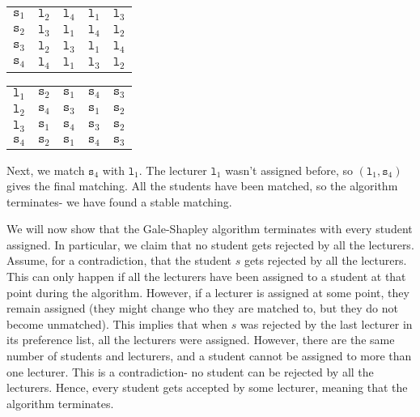 \documentclass[a4paper, openany]{memoir}
\begin{document}
    \begin{table}[H]
        \centering
        \begin{subtable}{0.45\textwidth}
            \centering
            \begin{tabular}{c|cccc}
                $\texttt{s}_1$ & {\color{blue!60} $\texttt{l}_2$} & \underline{$\texttt{l}_4$} & $\texttt{l}_1$ & $\texttt{l}_3$ \\
                $\texttt{s}_2$ & \underline{$\texttt{l}_3$} & $\texttt{l}_1$ & $\texttt{l}_4$ & $\texttt{l}_2$ \\
                $\texttt{s}_3$ & \underline{$\texttt{l}_2$} & $\texttt{l}_3$ & $\texttt{l}_1$ & $\texttt{l}_4$ \\
                $\texttt{s}_4$ & {\color{blue!60}$\texttt{l}_4$} & \underline{$\texttt{l}_1$} & $\texttt{l}_3$ & $\texttt{l}_2$
            \end{tabular}
        \end{subtable}
        \hfill
        \begin{subtable}{0.45\textwidth}
            \centering
            \begin{tabular}{c|cccc}
                $\texttt{l}_1$ & $\texttt{s}_2$ & $\texttt{s}_1$ & \underline{$\texttt{s}_4$} & $\texttt{s}_3$ \\
                $\texttt{l}_2$ & $\texttt{s}_4$ & \underline{$\texttt{s}_3$} & $\texttt{s}_1$ & $\texttt{s}_2$ \\
                $\texttt{l}_3$ & $\texttt{s}_1$ & $\texttt{s}_4$ & $\texttt{s}_3$ & \underline{$\texttt{s}_2$} \\
                $\texttt{s}_4$ & $\texttt{s}_2$ & \underline{$\texttt{s}_1$} & $\texttt{s}_4$ & $\texttt{s}_3$
            \end{tabular}
        \end{subtable}
    \end{table}
    \noindent Next, we match $\texttt{s}_4$ with $\texttt{l}_1$. The lecturer $\texttt{l}_1$ wasn't assigned before, so $(\texttt{l}_1, \texttt{s}_4)$ gives the final matching. All the students have been matched, so the algorithm terminates- we have found a stable matching.

    We will now show that the Gale-Shapley algorithm terminates with every student assigned. In particular, we claim that no student gets rejected by all the lecturers. Assume, for a contradiction, that the student $s$ gets rejected by all the lecturers. This can only happen if all the lecturers have been assigned to a student at that point during the algorithm. However, if a lecturer is assigned at some point, they remain assigned (they might change who they are matched to, but they do not become unmatched). This implies that when $s$ was rejected by the last lecturer in its preference list, all the lecturers were assigned. However, there are the same number of students and lecturers, and a student cannot be assigned to more than one lecturer. This is a contradiction- no student can be rejected by all the lecturers. Hence, every student gets accepted by some lecturer, meaning that the algorithm terminates. 
    
\end{document}
